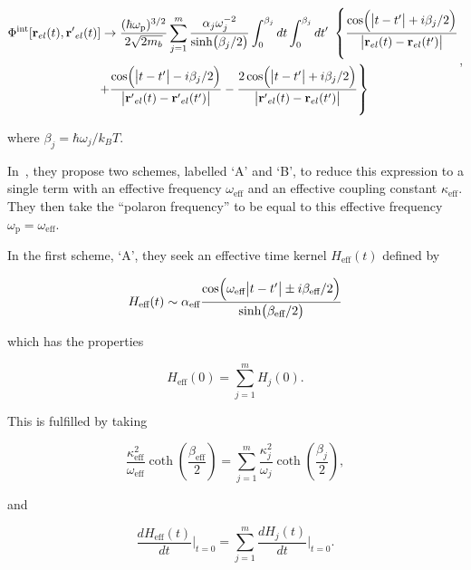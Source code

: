\begin{equation} \label{eqn:hellwarth_multi_action}
    \begin{gathered}
    \Phi^{\text{int}}[\vb{r}_{el}(t), \vb{r'}_{el}(t)] \rightarrow \frac{(\hbar\omega_{\text{p}})^{3/2}}{2\sqrt{2m_b}} \sum_{j=1}^m \frac{\alpha_j \omega_j^{-2}}{\sinh(\beta_j / 2)} \int^{\beta_j}_0 dt \int^{\beta_j}_0 dt'\ \left\{ \frac{\cos(\abs{t - t'} + i\beta_j / 2)}{\abs{\vb{r}_{el}(t) - \vb{r}_{el}(t')}} \right. \\
    \left. + \frac{\cos(\abs{t - t'} - i\beta_j / 2)}{\abs{\vb{r'}_{el}(t) - \vb{r'}_{el}(t')}} - \frac{2\cos(\abs{t - t'} + i\beta_j / 2)}{\abs{\vb{r'}_{el}(t) - \vb{r}_{el}(t')}} \right\}
    \end{gathered},
\end{equation}

where $\beta_j = \hbar\omega_j / k_B T$. 

In~\cite{hellwarth_mobility_1999}, they propose two schemes, labelled `A' and `B', to reduce this expression to a single term with an effective frequency $\omega_{\text{eff}}$ and an effective coupling constant $\kappa_{\text{eff}}$. They then take the ``polaron frequency'' to be equal to this effective frequency $\omega_{\text{p}} = \omega_{\text{eff}}$. 

In the first scheme, `A', they seek an effective time kernel $H_{\text{eff}}(t)$ defined by

\begin{equation}
    H_{\text{eff}}(t) \sim \alpha_{\text{eff}} \frac{\cos(\omega_{\text{eff}}\abs{t - t'} \pm i\beta_{\text{eff}} / 2)}{\sinh(\beta_{\text{eff}} / 2)}
\end{equation}

which has the properties

\begin{equation} \label{eqn:hellwarth_scheme_s}
    H_{\text{eff}}(0) = \sum_{j=1}^m H_{j}(0).
\end{equation}

This is fulfilled by taking

\begin{equation}
    \frac{\kappa_{\text{eff}}^2}{\omega_{\text{eff}}} \coth(\frac{\beta_{\text{eff}}}{2}) = \sum_{j=1}^m \frac{\kappa_{j}^2}{\omega_{j}} \coth(\frac{\beta_{j}}{2}),
\end{equation}

and

\begin{equation}
    \frac{dH_{\text{eff}}(t)}{dt} \biggr\rvert_{t=0} = \sum_{j=1}^m \frac{dH_{j}(t)}{dt} \biggr\rvert_{t=0}.
\end{equation}

